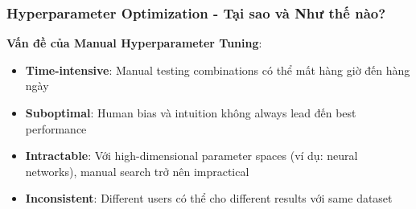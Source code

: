 \subsubsection{Hyperparameter Optimization - Tại sao và Như thế nào?}

\textbf{Vấn đề của Manual Hyperparameter Tuning}:
\begin{itemize}[leftmargin=*]
    \item \textbf{Time-intensive}: Manual testing combinations có thể mất hàng giờ đến hàng ngày
    \item \textbf{Suboptimal}: Human bias và intuition không always lead đến best performance
    \item \textbf{Intractable}: Với high-dimensional parameter spaces (ví dụ: neural networks), manual search trở nên impractical
    \item \textbf{Inconsistent}: Different users có thể cho different results với same dataset
\end{itemize}

